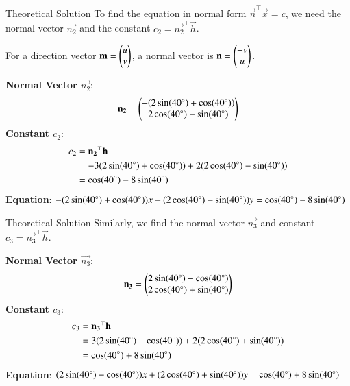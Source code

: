 \documentclass{beamer}
\begin{document}
\begin{frame}{Theoretical Solution}
To find the equation in normal form $\vec{n}^\top \vec{x} = c$, we need the normal vector $\vec{n_2}$ and the constant $c_2 = \vec{n_2}^\top \vec{h}$.
\bigskip

For a direction vector $\mathbf{m} = \begin{pmatrix}u \\ v\end{pmatrix}$, a normal vector is $\mathbf{n} = \begin{pmatrix}-v \\ u\end{pmatrix}$.
\bigskip

\textbf{Normal Vector $\vec{n_2}$}:
$$ \mathbf{n_2} = \begin{pmatrix}-(2\sin(40\degree) + \cos(40\degree)) \\ 2\cos(40\degree) - \sin(40\degree)\end{pmatrix} $$
\textbf{Constant $c_2$}:
\begin{align*}
c_2 &= \mathbf{n_2}^\top \mathbf{h} \\
&= -3(2\sin(40\degree) + \cos(40\degree)) + 2(2\cos(40\degree) - \sin(40\degree)) \\
&= \cos(40\degree) - 8\sin(40\degree)
\end{align*}
\textbf{Equation}: $-(2\sin(40\degree) + \cos(40\degree))x + (2\cos(40\degree) - \sin(40\degree))y = \cos(40\degree) - 8\sin(40\degree)$
\end{frame}

\begin{frame}{Theoretical Solution}
Similarly, we find the normal vector $\vec{n_3}$ and constant $c_3 = \vec{n_3}^\top \vec{h}$.
\bigskip

\textbf{Normal Vector $\vec{n_3}$}:
$$ \mathbf{n_3} = \begin{pmatrix}2\sin(40\degree) - \cos(40\degree) \\ 2\cos(40\degree) + \sin(40\degree)\end{pmatrix} $$
\bigskip
\textbf{Constant $c_3$}:
\begin{align*}
c_3 &= \mathbf{n_3}^\top \mathbf{h} \\
&= 3(2\sin(40\degree) - \cos(40\degree)) + 2(2\cos(40\degree) + \sin(40\degree)) \\
&= \cos(40\degree) + 8\sin(40\degree)
\end{align*}
\textbf{Equation}: $(2\sin(40\degree) - \cos(40\degree))x + (2\cos(40\degree) + \sin(40\degree))y = \cos(40\degree) + 8\sin(40\degree)$
\end{frame}
\end{document}
